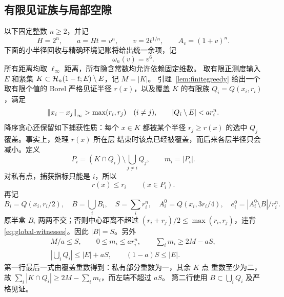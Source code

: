 \subsection{有限见证族与局部空隙}

以下固定整数 \(n\ge2\)，并记
\[
 H=2^n,\qquad a=Ht=v^n,\qquad v=2t^{1/n},\qquad A_v=(1+v)^n.
\]
下面的小半径回收与精确环境记账将给出统一余项，记
\begin{equation}\label{eq:global-omega}
 \omega_n(v)=v^6.
\end{equation}
所有距离均取 \(\ell_\infty\) 距离，所有隐含常数均允许依赖固定维数。
取有限正测度输入 \(E\) 和紧集
\(K\subset\mathcal H_n(1-t;E)\setminus E\)，记 \(M=|K|\)。
引理~\ref{lem:finitegreedy} 给出一个取有限个值的 Borel 严格见证半径
\(r(x)\)，以及覆盖 \(K\) 的有限族 \(Q_i=Q(x_i,r_i)\)，满足
\begin{equation}\label{eq:global-witnesses}
 \left\lVert x_i-x_j\right\rVert_\infty>\max(r_i,r_j)\quad(i\ne j),\qquad
 |Q_i\setminus E|<ar_i^n.
\end{equation}
降序贪心还保留如下捕获性质：每个 \(x\in K\) 都被某个半径
\(r_j\ge r(x)\) 的选中 \(Q_j\) 覆盖。事实上，处理 \(r(x)\) 所在层
结束时该点已经被覆盖，而后来各层半径只会减小。定义
\[
 P_i=(K\cap Q_i)\setminus\bigcup_{j\ne i}Q_j,\qquad m_i=|P_i|.
\]
对私有点，捕获指标只能是 \(i\)，所以
\begin{equation}\label{eq:global-private-radius}
 r(x)\le r_i\qquad(x\in P_i).
\end{equation}
再记
\[
 B_i=Q(x_i,r_i/2),\quad B=\bigcup_iB_i,\quad
 S=\sum_i r_i^n,\quad A_i^0=Q(x_i,3r_i/4),\quad
 e_i^0=|A_i^0\setminus B|/r_i^n.
\]
原半盒 \(B_i\) 两两不交；否则中心距离不超过
\((r_i+r_j)/2\le\max(r_i,r_j)\)，违背
\eqref{eq:global-witnesses}。因此 \(|B|=S\)。另外
\begin{gather}
 M/a\le S,\qquad 0\le m_i\le ar_i^n,\qquad
 \sum_i m_i\ge2M-aS,
 \label{eq:global-basic-private}\\
 \left|\bigcup_iQ_i\right|\le |E|+aS,\qquad
 (1-a)S\le|E|.
 \label{eq:global-basic-volumes}
\end{gather}
第一行最后一式由覆盖重数得到：私有部分重数为一，其余 \(K\) 点
重数至少为二，故
\(\sum_i|K\cap Q_i|\ge2M-\sum_i m_i\)，而左端不超过 \(aS\)。
第二行使用 \(B\subset\bigcup_iQ_i\) 及严格见证。

